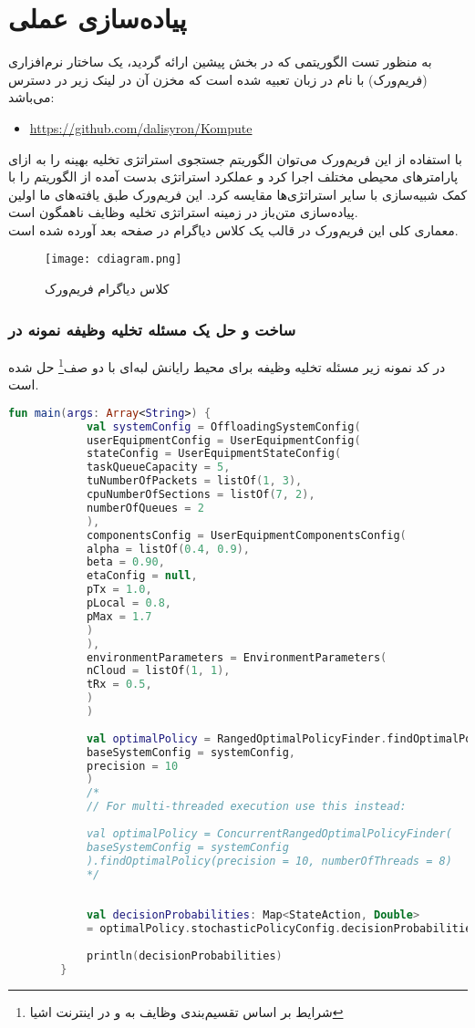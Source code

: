 \chapter{پیاده‌سازی عملی}
به منظور تست الگوریتمی که در بخش پیشین ارائه گردید، یک ساختار نرم‌افزاری (فریم‌ورک) با نام  در زبان  تعبیه شده است که مخزن آن در لینک زیر در دسترس می‌باشد:
\begin{latin}
	\begin{itemize}
		\item \href{https://github.com/dalisyron/Kompute}{https://github.com/dalisyron/Kompute}
	\end{itemize}
\end{latin}
با استفاده از این فریم‌ورک می‌توان الگوریتم جستجوی استراتژی تخلیه بهینه را به ازای پارامترهای محیطی مختلف اجرا کرد و عملکرد استراتژی بدست آمده از الگوریتم را با کمک شبیه‌سازی با سایر استراتژی‌ها مقایسه کرد. این فریم‌ورک طبق یافته‌های ما اولین پیاده‌سازی متن‌باز در زمینه استراتژی تخلیه وظایف ناهمگون است. \\

معماری کلی این فریم‌ورک در قالب یک کلاس دیاگرام در صفحه بعد آورده شده است.
\newpage
\begin{figure}[H]
	\texttt{[image: cdiagram.png]}
	\caption{کلاس دیاگرام فریم‌ورک }
\end{figure}
\newpage
\subsection{ساخت و حل یک مسئله تخلیه وظیفه نمونه در }
در کد نمونه زیر مسئله تخلیه وظیفه‌ برای محیط رایانش لبه‌ای با دو صف\footnote{شرایط بر اساس تقسیم‌بندی وظایف به  و  در اینترنت اشیا} حل شده است.
\begin{latin}
	\begin{lstlisting}[language=Kotlin]
		fun main(args: Array<String>) {
			val systemConfig = OffloadingSystemConfig(
			userEquipmentConfig = UserEquipmentConfig(
			stateConfig = UserEquipmentStateConfig(
			taskQueueCapacity = 5,
			tuNumberOfPackets = listOf(1, 3),
			cpuNumberOfSections = listOf(7, 2),
			numberOfQueues = 2
			),
			componentsConfig = UserEquipmentComponentsConfig(
			alpha = listOf(0.4, 0.9),
			beta = 0.90,
			etaConfig = null,
			pTx = 1.0,
			pLocal = 0.8,
			pMax = 1.7
			)
			),
			environmentParameters = EnvironmentParameters(
			nCloud = listOf(1, 1),
			tRx = 0.5,
			)
			)
			
			val optimalPolicy = RangedOptimalPolicyFinder.findOptimalPolicy(
			baseSystemConfig = systemConfig, 
			precision = 10
			)
			/*
			// For multi-threaded execution use this instead:
			
			val optimalPolicy = ConcurrentRangedOptimalPolicyFinder(
			baseSystemConfig = systemConfig
			).findOptimalPolicy(precision = 10, numberOfThreads = 8)
			*/
			
			
			val decisionProbabilities: Map<StateAction, Double>
			= optimalPolicy.stochasticPolicyConfig.decisionProbabilities
			
			println(decisionProbabilities)
		}
	\end{lstlisting}
\end{latin}
\newpage